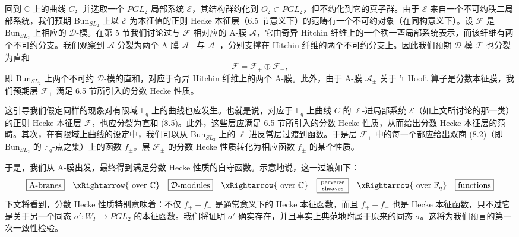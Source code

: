 \documentclass[11pt,a4paper]{article}
\newcommand{\Bun}{\mathrm{Bun}}
\newcommand{\CD}{\mathcal{D}}
\begin{document}
回到 $\mathbb{C}$ 上的曲线 $C$，并选取一个 $PGL_2$-局部系统 $\mathcal{E}$，其结构群约化到 $O_2\subset PGL_2$，但不约化到它的真子群。由于 $\mathcal{E}$ 来自一个不可约秩二局部系统，我们预期 $\Bun_{SL_2}$ 上以 $\mathcal{E}$ 为本征值的正则 Hecke 本征层（6.5 节意义下）的范畴有一个不可约对象（在同构意义下）。设 $\mathcal{F}$ 是 $\Bun_{SL_2}$ 上相应的 $\CD$-模。在第 5 节我们讨论过与 $\mathcal{F}$ 相对应的 A-膜 $\mathcal{A}$，它由奇异 Hitchin 纤维上的一个秩一酉局部系统表示，而该纤维有两个不可约分支。我们观察到 $\mathcal{A}$ 分裂为两个 A-膜 $\mathcal{A}_+$ 与 $\mathcal{A}_-$，分别支撑在 Hitchin 纤维的两个不可约分支上。因此我们预期 $\CD$-模 $\mathcal{F}$ 也分裂为直和
\begin{equation}\tag{8.5}
\mathcal{F} = \mathcal{F}_+ \oplus \mathcal{F}_-,
\end{equation}
即 $\Bun_{SL_2}$ 上两个不可约 $\CD$-模的直和，对应于奇异 Hitchin 纤维上的两个 A-膜。此外，由于 A-膜 $\mathcal{A}_\pm$ 关于 't Hooft 算子是分数本征膜，我们预期层 $\mathcal{F}_\pm$ 满足 6.5 节所引入的分数 Hecke 性质。

这引导我们假定同样的现象对有限域 $\mathbb{F}_q$ 上的曲线也应发生。也就是说，对应于 $\mathbb{F}_q$ 上曲线 $C$ 的 $\ell$-进局部系统 $\mathcal{E}$（如上文所讨论的那一类）的正则 Hecke 本征层 $\mathcal{F}$，也应分裂为直和 (8.5)。此外，这些层应满足 6.5 节所引入的分数 Hecke 性质，从而给出分数 Hecke 本征层的范畴。其次，在有限域上曲线的设定中，我们可以从 $\Bun_{SL_2}$ 上的 $\ell$-进反常层过渡到函数。于是层 $\mathcal{F}_\pm$ 中的每一个都应给出双商 (8.2)（即 $\Bun_{SL_2}$ 的 $\mathbb{F}_q$-点之集）上的函数 $f_\pm$。层 $\mathcal{F}_\pm$ 的分数 Hecke 性质转化为相应函数 $f_\pm$ 的某个性质。

于是，我们从 A-膜出发，最终得到满足分数 Hecke 性质的自守函数。示意地说，这一过渡如下：
\[
\begin{array}{ccccccc}
\boxed{\text{A-branes}} & \xRightarrow{\ \text{over }\mathbb{C}} &
\boxed{\CD\text{-modules}} & \xRightarrow{\ \text{over }\mathbb{C}} &
\boxed{\begin{smallmatrix}\text{perverse}\\ \text{sheaves}\end{smallmatrix}} & \xRightarrow{\ \text{over }\mathbb{F}_q} &
\boxed{\text{functions}}
\end{array}
\]
下文将看到，分数 Hecke 性质特别意味着：不仅 $f_+ + f_-$ 是通常意义下的 Hecke 本征函数，而且 $f_+ - f_-$ 也是 Hecke
本征函数，只不过它是关于另一个同态 $\sigma' : W_F \to PGL_2$ 的本征函数。我们将证明 $\sigma'$ 确实存在，并且事实上典范地附属于原来的同态 $\sigma$。这将为我们预言的第一次一致性检验。
\end{document}
